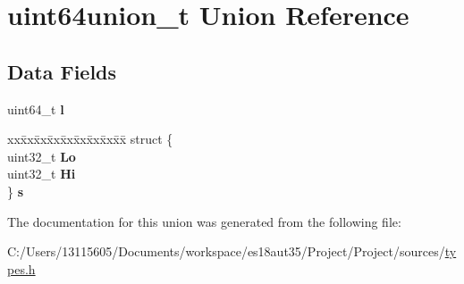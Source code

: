 \hypertarget{unionuint64union__t}{}\section{uint64union\+\_\+t Union Reference}
\label{unionuint64union__t}
\subsection*{Data Fields}
\begin{DoxyCompactItemize}
\item 
\hypertarget{unionuint64union__t_a2d5e8db071e91dd1ed90c03584facdfd}{}uint64\+\_\+t {\bfseries l}\label{unionuint64union__t_a2d5e8db071e91dd1ed90c03584facdfd}

\item 
\hypertarget{unionuint64union__t_a7a3d9c3acdab6ba7e2036681c0202d2e}{}\begin{tabbing}
xx\=xx\=xx\=xx\=xx\=xx\=xx\=xx\=xx\=\kill
struct \{\\
\>uint32\_t {\bfseries Lo}\\
\>uint32\_t {\bfseries Hi}\\
\} {\bfseries s}\label{unionuint64union__t_a7a3d9c3acdab6ba7e2036681c0202d2e}
\\

\end{tabbing}\end{DoxyCompactItemize}


The documentation for this union was generated from the following file\+:\begin{DoxyCompactItemize}
\item 
C\+:/\+Users/13115605/\+Documents/workspace/es18aut35/\+Project/\+Project/sources/\hyperlink{types_8h}{types.\+h}\end{DoxyCompactItemize}
